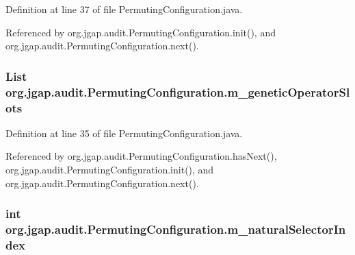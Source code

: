 Definition at line 37 of file Permuting\-Configuration.\-java.



Referenced by org.\-jgap.\-audit.\-Permuting\-Configuration.\-init(), and org.\-jgap.\-audit.\-Permuting\-Configuration.\-next().

\hypertarget{classorg_1_1jgap_1_1audit_1_1_permuting_configuration_a7d59d322afaeac139573df83f7e420d4}{
\subsubsection[{m\-\_\-genetic\-Operator\-Slots}]{\setlength{\rightskip}{0pt plus 5cm}List org.\-jgap.\-audit.\-Permuting\-Configuration.\-m\-\_\-genetic\-Operator\-Slots\hspace{0.3cm}{\ttfamily [private]}}}\label{classorg_1_1jgap_1_1audit_1_1_permuting_configuration_a7d59d322afaeac139573df83f7e420d4}


Definition at line 35 of file Permuting\-Configuration.\-java.



Referenced by org.\-jgap.\-audit.\-Permuting\-Configuration.\-has\-Next(), org.\-jgap.\-audit.\-Permuting\-Configuration.\-init(), and org.\-jgap.\-audit.\-Permuting\-Configuration.\-next().

\hypertarget{classorg_1_1jgap_1_1audit_1_1_permuting_configuration_acb728454c8352af48836c9ee42a0f7d0}{
\subsubsection[{m\-\_\-natural\-Selector\-Index}]{\setlength{\rightskip}{0pt plus 5cm}int org.\-jgap.\-audit.\-Permuting\-Configuration.\-m\-\_\-natural\-Selector\-Index\hspace{0.3cm}{\ttfamily [private]}}}\label{classorg_1_1jgap_1_1audit_1_1_permuting_configuration_acb728454c8352af48836c9ee42a0f7d0}


